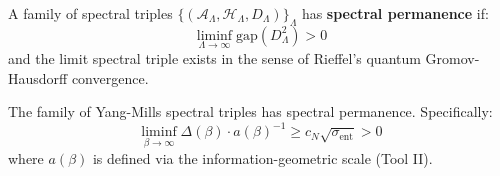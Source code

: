 \begin{definition}
\label{def:spectral-permanence}
A family of spectral triples $\{(\mathcal{A}_\Lambda, \mathcal{H}_\Lambda, D_\Lambda)\}_\Lambda$ 
has \textbf{spectral permanence} if:
\[
\liminf_{\Lambda \to \infty} \text{gap}(D_\Lambda^2) > 0
\]
and the limit spectral triple exists in the sense of Rieffel's quantum Gromov-Hausdorff convergence.
\end{definition}

\begin{theorem}
\label{thm:spectral-permanence-geometric}
The family of Yang-Mills spectral triples has spectral permanence. Specifically:
\[
\liminf_{\beta \to \infty} \Delta(\beta) \cdot a(\beta)^{-1} \geq c_N \sqrt{\sigma_{\text{ent}}} > 0
\]
where $a(\beta)$ is defined via the information-geometric scale (Tool II).
\end{theorem}

